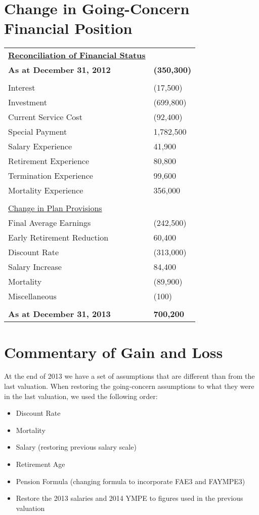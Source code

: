 \documentclass{report}
\begin{document}
\section{Change in Going-Concern Financial Position}
\bgroup
\normalsize
\def\arraystretch{1.5}
\begin{longtable}[l]{p{6.5cm} p{6cm}}
\uline{\textbf{Reconciliation of Financial Status }}&  \\
\textbf{As at December 31, 2012} & \textbf{(350,300)} \\ \\
Interest & (17,500) \\
Investment & (699,800) \\ 
Current Service Cost & (92,400) \\ 
Special Payment & 1,782,500 \\ 
Salary Experience & 41,900 \\ 
Retirement Experience & 80,800 \\ 
Termination Experience & 99,600 \\
Mortality Experience & 356,000 \\ \\
\uline{Change in Plan Provisions} \\
Final Average Earnings & (242,500) \\ 
Early Retirement Reduction & 60,400 \\ 
Discount Rate & (313,000) \\
Salary Increase & 84,400 \\ 
Mortality & (89,900) \\ 
Miscellaneous & (100) \\ \\
\textbf{As at December 31, 2013} & \textbf{700,200}
\end{longtable}
\egroup

\section{Commentary of Gain 
and Loss}

At the end of 2013 we have a set of assumptions that are different than from the last valuation. When restoring the going-concern assumptions to what they were in the last valuation, we used the following order:
\begin{itemize}
\item Discount Rate
\item Mortality
\item Salary (restoring previous salary scale)
\item Retirement Age
\item Pension Formula (changing formula to incorporate FAE3 and FAYMPE3)
\item Restore the 2013 salaries and 2014 YMPE to figures used in the previous valuation
\end{itemize}
\end{document}
